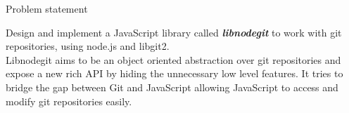 \begin{center}
  {\huge Problem statement} \\[1.4cm]
\end{center}


Design and implement a JavaScript library called
\textit{\textbf{libnodegit}} to work
with git repositories, using node.js and libgit2. \\

Libnodegit aims to be an object oriented abstraction over git
repositories and expose a new rich API by hiding the unnecessary low
level features. It tries to bridge the gap between Git and JavaScript
allowing JavaScript to access and modify git repositories easily.
